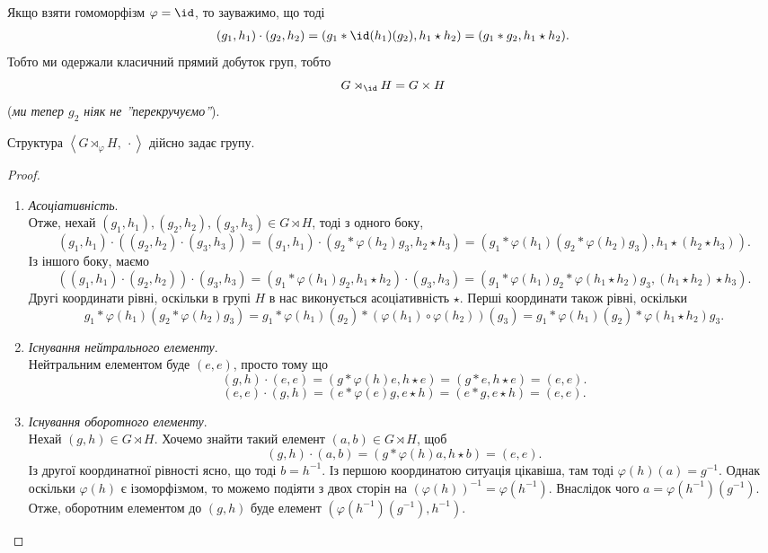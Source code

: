\documentclass{math_library}
\begin{document}
\begin{remark}
Якщо взяти гомоморфізм $\varphi = \id$, то зауважимо, що тоді
\begin{align*}
(g_1,h_1) \cdot (g_2,h_2) = (g_1*\id(h_1)(g_2), h_1 \star h_2) = (g_1*g_2, h_1 \star h_2).
\end{align*}
Тобто ми одержали класичний прямий добуток груп, тобто
\[
G \rtimes_{\id} H = G \times H
\]
(\textit{ми тепер $g_2$ ніяк не ''перекручуємо''}).
\end{remark}

\begin{proposition}
Структура $\left<G \rtimes_\varphi H,\ \cdot\right>$ дійсно задає групу.
\end{proposition}

\begin{proof}
\begin{enumerate}[wide=0pt,topsep=0pt,label={\Roman*.}]
\item \textit{Асоціативність}.\\
Отже, нехай $(g_1,h_1), (g_2,h_2), (g_3,h_3) \in G \rtimes H$, тоді з одного боку,
\[
(g_1,h_1) \cdot ((g_2,h_2) \cdot (g_3,h_3)) = (g_1,h_1) \cdot (g_2 * \varphi(h_2)g_3, h_2 \star h_3) = (g_1*\varphi(h_1)(g_2*\varphi(h_2)g_3), h_1 \star (h_2 \star h_3)).
\]
Із іншого боку, маємо
\[
((g_1,h_1) \cdot (g_2,h_2)) \cdot (g_3,h_3) = (g_1*\varphi(h_1)g_2, h_1 \star h_2) \cdot (g_3,h_3) = (g_1*\varphi(h_1)g_2*\varphi(h_1 \star h_2)g_3, (h_1 \star h_2) \star h_3).
\]
Другі координати рівні, оскільки в групі $H$ в нас виконується асоціативність $\star$. Перші координати також рівні, оскільки
\[
g_1 * \varphi(h_1)(g_2* \varphi(h_2)g_3) = g_1 * \varphi(h_1)(g_2) * (\varphi(h_1) \circ \varphi(h_2))(g_3) = g_1 * \varphi(h_1)(g_2) * \varphi(h_1 \star h_2)g_3. 
\]

\item \textit{Існування нейтрального елементу}.\\
Нейтральним елементом буде $(e,e)$, просто тому що
\[
(g,h) \cdot (e,e) = (g*\varphi(h)e, h \star e) = (g*e, h \star e) = (e,e).
\]
\[
(e,e) \cdot (g,h) = (e*\varphi(e)g, e \star h) = (e*g, e \star h) = (e,e).
\]
\item \textit{Існування оборотного елементу}.\\
Нехай $(g,h) \in G \rtimes H$. Хочемо знайти такий елемент $(a,b) \in G \rtimes H$, щоб
\[
(g,h) \cdot (a,b) = (g*\varphi(h)a, h \star b) = (e,e).
\]
Із другої координатної рівності ясно, що тоді $b = h^{-1}$. Із першою координатою ситуація цікавіша, там тоді $\varphi(h)(a) = g^{-1}$. Однак оскільки $\varphi(h)$ є ізоморфізмом, то можемо подіяти з двох сторін на $(\varphi(h))^{-1} = \varphi(h^{-1})$. Внаслідок чого $a = \varphi(h^{-1})(g^{-1})$.\\
Отже, оборотним елементом до $(g,h)$ буде елемент $(\varphi(h^{-1})(g^{-1}), h^{-1})$. \qedhere
\end{enumerate}
\end{proof}
\end{document}
